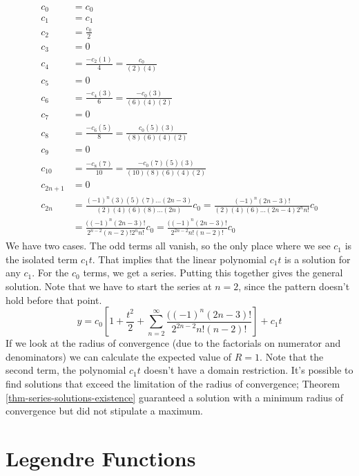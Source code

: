 \documentclass[fleqn,letterpaper]{report}
\begin{document}
\begin{example}
\begin{align*}
c_0 & = c_0 \\
c_1 & = c_1 \\
c_2 & = \frac{c_0}{2} \\
c_3 & = 0 \\
c_4 & = \frac{-c_2(1)}{4} = \frac{c_0}{(2)(4)}\\
c_5 & = 0 \\
c_6 & = \frac{-c_4(3)}{6} = \frac{-c_0(3)}{(6)(4)(2)} \\
c_7 & = 0 \\
c_8 & = \frac{-c_6(5)}{8} = \frac{c_0(5)(3)}{(8)(6)(4)(2)} \\
c_9 & = 0 \\
c_{10} & = \frac{-c_8(7)}{10} = \frac{-c_0(7)(5)(3)}{(10)(8)(6)(4)(2)} \\
c_{2n+1} & = 0 \\
c_{2n} & = \frac{(-1)^n (3)(5)(7)\ldots (2n-3)}{(2)(4)(6)(8)
\ldots (2n)} c_0 = \frac{(-1)^n (2n-3)!}{(2)(4)(6) \ldots (2n-4)
2^n n!} c_0 \\
& = \frac{((-1)^n (2n-3)!}{2^{n-2} (n-2)! 2^n n!} c_0
= \frac{((-1)^n (2n-3)!}{2^{2n-2} n! (n-2)!} c_0
\end{align*}
We have two cases. The odd terms all vanish, so the only
place where we see $c_1$ is the isolated term $c_1 t$. That
implies that the linear polynomial $c_1 t$ is a solution for
any $c_1$. For the $c_0$ terms, we get a series. Putting this
together gives the general solution. Note that we have to start
the series at $n=2$, since the pattern doesn't hold before that
point. 
\begin{equation*}
y = c_0 \left[1 + \frac{t^2}{2} + \sum_{n=2}^\infty
\frac{((-1)^n (2n-3)!}{2^{2n-2} n! (n-2)!} \right] + c_1 t 
\end{equation*}
If we look at the radius of convergence (due to the
factorials on numerator and denominators) we can calculate the
expected value of $R=1$. Note that the second term, the
polynomial $c_1 t$ doesn't have a domain restriction. It's
possible to find solutions that exceed the limitation of the
radius of convergence; Theorem \ref{thm-series-solutions-existence}
guaranteed a solution with a minimum radius of convergence but
did not stipulate a maximum. 
\end{example}

\section{Legendre Functions}
\label{legendre}
\end{document}
